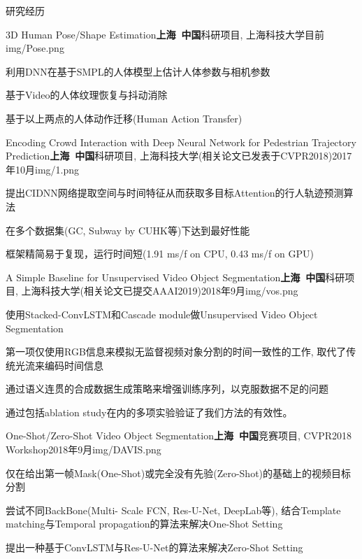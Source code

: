 \documentclass{resume_ch} %
\begin{document}
\begin{rSection}{研究经历}

\begin{rSubsection}{3D Human Pose/Shape Estimation}{\bf 上海\ 中国}{科研项目, 上海科技大学}{目前}{img/Pose.png}
    \item 利用DNN在基于SMPL的人体模型上估计人体参数与相机参数
    \item 基于Video的人体纹理恢复与抖动消除
    \item 基于以上两点的人体动作迁移(Human Action Transfer)
\end{rSubsection}

\begin{rSubsection}{Encoding Crowd Interaction with Deep Neural Network for Pedestrian Trajectory Prediction}{\bf 上海\ 中国}{科研项目, 上海科技大学(相关论文已发表于CVPR2018)}{2017年10月}{img/1.png}
    \item 提出CIDNN网络提取空间与时间特征从而获取多目标Attention的行人轨迹预测算法
    \item 在多个数据集(GC, Subway by CUHK等)下达到最好性能
    \item 框架精简易于复现，运行时间短(1.91 ms/f on CPU, 0.43 ms/f on GPU)
\end{rSubsection}


\begin{rSubsection}{A Simple Baseline for Unsupervised Video Object Segmentation}{\bf 上海\ 中国}{科研项目, 上海科技大学(相关论文已提交AAAI2019)}{2018年9月}{img/vos.png}
    \item 使用Stacked-ConvLSTM和Cascade module做Unsupervised Video Object Segmentation
    \item 第一项仅使用RGB信息来模拟无监督视频对象分割的时间一致性的工作, 取代了传统光流来编码时间信息
    \item 通过语义连贯的合成数据生成策略来增强训练序列，以克服数据不足的问题
    \item 通过包括ablation study在内的多项实验验证了我们方法的有效性。
\end{rSubsection}


\begin{rSubsection}{One-Shot/Zero-Shot Video Object Segmentation}{\bf 上海\ 中国}{竞赛项目, CVPR2018 Workshop}{2018年9月}{img/DAVIS.png}
    \item 仅在给出第一帧Mask(One-Shot)或完全没有先验(Zero-Shot)的基础上的视频目标分割
    \item 尝试不同BackBone(Multi- Scale FCN, Res-U-Net, DeepLab等), 结合Template matching与Temporal propagation的算法来解决One-Shot Setting
    \item 提出一种基于ConvLSTM与Res-U-Net的算法来解决Zero-Shot Setting
\end{rSubsection}



\end{rSection}
\end{document}
